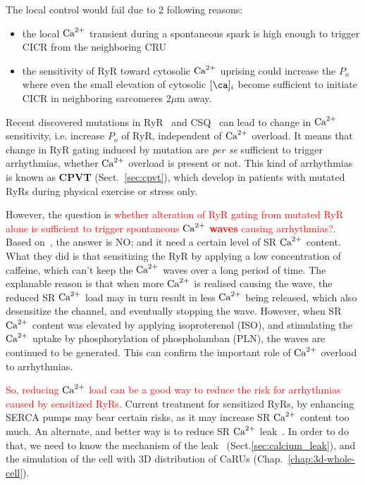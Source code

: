 \begin{framed}
  
  The local control would fail due to 2 following reasons:
  \begin{itemize}
  \item the local ${\text{Ca}^{2+}}$ transient during a spontaneous spark is high
    enough to trigger CICR from the neighboring CRU
  \item the sensitivity of RyR toward cytosolic ${\text{Ca}^{2+}}$ uprising could
    increase the $P_o$ where even the small elevation of cytosolic
    $[\ca]_i$ become sufficient to initiate CICR in neighboring
    sarcomeres 2$\mu$m away. 
  \end{itemize}
\end{framed}


Recent discovered mutations in RyR~\citep{}
and CSQ~\citep{}
can lead to change in ${\text{Ca}^{2+}}$ sensitivity, i.e. increase $P_o$ of RyR,
independent of ${\text{Ca}^{2+}}$ overload. It means that change in RyR gating
induced by mutation are {\it per se} sufficient to trigger
arrhythmias, whether ${\text{Ca}^{2+}}$ overload is present or not. This kind of
arrhythmias is known as {\bf CPVT} (Sect.~\ref{sec:cpvt}), which
develop in patients with mutated RyRs during physical exercise or
stress only.

However, the question is
\textcolor{red}{whether alteration of RyR gating from mutated RyR
  alone is sufficient to trigger spontaneous ${\text{Ca}^{2+}}$ {\bf waves} causing
  arrhythmias?}.
Based on~\citep{venetucci2007}, the answer is NO; and it need a
certain level of SR ${\text{Ca}^{2+}}$ content. What they did is that sensitizing
the RyR by applying a low concentration of caffeine, which can't keep
the ${\text{Ca}^{2+}}$ waves over a long period of time. The explanable reason is
that when more ${\text{Ca}^{2+}}$ is realised causing the wave, the reduced SR
${\text{Ca}^{2+}}$ load may in turn result in less ${\text{Ca}^{2+}}$ being released, which also
desensitize the channel, and eventually stopping the wave. However,
when SR ${\text{Ca}^{2+}}$ content was elevated by applying isoproterenol (ISO),
and stimulating the ${\text{Ca}^{2+}}$ uptake by phosphorylation of phospholamban
(PLN), the waves are continued to be generated. This can confirm the
important role of ${\text{Ca}^{2+}}$ overload to arrhythmias.

\textcolor{red}{So, reducing ${\text{Ca}^{2+}}$ load can be a good way to reduce
  the risk for arrhythmias caused by sensitized RyRs}.
Current treatment for sensitized RyRs, by enhancing SERCA pumps may bear certain
risks, as it may increase SR ${\text{Ca}^{2+}}$ content too much. An alternate, and better
way is to reduce SR ${\text{Ca}^{2+}}$ leak~\citep{wehrens2004nta}.  In order to do that, we
need to know the mechanism of the leak~\citep{Bellinger2008}
(Sect.\ref{sec:calcium_leak}), and the simulation of the cell with 3D distribution of
CaRUs (Chap.~\ref{chap:3d-whole-cell}).

